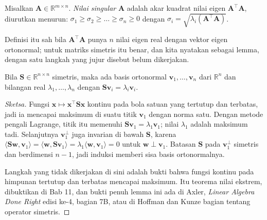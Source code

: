 
\begin{definisi}
Misalkan $\mathbf{A}\in\mathbb{R}^{m\times n}$. \emph{Nilai singular} $\mathbf{A}$
adalah akar kuadrat nilai eigen $\mathbf{A}^{\top}\mathbf{A}$, diurutkan menurun:
$\sigma_{1}\ge\sigma_{2}\ge\dots\ge\sigma_{n}\ge0$ dengan
$\sigma_{i}=\sqrt{\lambda_{i}(\mathbf{A}^{\top}\mathbf{A})}$.
\end{definisi}

Definisi itu sah bila $\mathbf{A}^{\top}\mathbf{A}$ punya $n$ nilai eigen real dengan
vektor eigen ortonormal; untuk matriks simetris itu benar, dan kita nyatakan sebagai
lemma, dengan satu langkah yang jujur disebut belum dikerjakan.

\begin{lemma}
Bila $\mathbf{S}\in\mathbb{R}^{n\times n}$ simetris, maka ada basis ortonormal
$\mathbf{v}_{1},\dots,\mathbf{v}_{n}$ dari $\mathbb{R}^{n}$ dan bilangan real
$\lambda_{1},\dots,\lambda_{n}$ dengan $\mathbf{S}\mathbf{v}_{i}=\lambda_{i}\mathbf{v}_{i}$.
\end{lemma}

\begin{proof}[Sketsa]
Fungsi $\mathbf{x}\mapsto\mathbf{x}^{\top}\mathbf{S}\mathbf{x}$ kontinu pada bola satuan
yang tertutup dan terbatas, jadi ia mencapai maksimum di suatu titik
$\mathbf{v}_{1}$ dengan norma satu. Dengan metode pengali Lagrange, titik itu memenuhi
$\mathbf{S}\mathbf{v}_{1}=\lambda_{1}\mathbf{v}_{1}$; nilai $\lambda_{1}$ adalah maksimum
tadi. Selanjutnya $\mathbf{v}_{1}^{\perp}$ juga invarian di bawah $\mathbf{S}$, karena
$\langle\mathbf{S}\mathbf{w},\mathbf{v}_{1}\rangle
=\langle\mathbf{w},\mathbf{S}\mathbf{v}_{1}\rangle
=\lambda_{1}\langle\mathbf{w},\mathbf{v}_{1}\rangle=0$ untuk $\mathbf{w}\perp\mathbf{v}_{1}$.
Batasan $\mathbf{S}$ pada $\mathbf{v}_{1}^{\perp}$ simetris dan berdimensi $n-1$, jadi
induksi memberi sisa basis ortonormalnya.

Langkah yang tidak dikerjakan di sini adalah bukti bahwa fungsi kontinu pada himpunan
tertutup dan terbatas mencapai maksimum. Itu teorema nilai ekstrem, dibuktikan di Bab 11,
dan bukti penuh lemma ini ada di Axler, \emph{Linear Algebra Done Right} edisi ke-4,
bagian 7B, atau di Hoffman dan Kunze bagian tentang operator simetris.
\end{proof}


